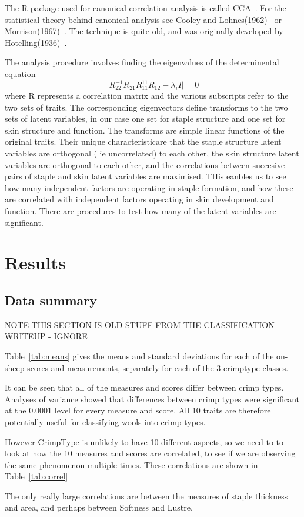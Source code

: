 \documentclass[titlepage]{article}  %
\begin{document}
The R package used for canonical correlation analysis is called CCA~\cite{rpack:1}. For the statistical theory behind canonical analysis see Cooley and Lohnes(1962)~\cite{cool:62} or Morrison(1967)~\cite{morr:67}. The technique is quite old, and was originally developed by Hotelling(1936)~\cite{hote:36}.

The analysis procedure involves finding the eigenvalues of the determinental equation
\begin{equation}
\mid R_{22}^{-1} R_{21} R_{11}^{11} R_{12} - \lambda_{i}I \mid = 0
\end{equation}
where R represents a correlation matrix and the various subscripts refer to the two sets of traits.
The corresponding eigenvectors define transforms to the two sets of latent variables, in our case one set for staple structure and one set for skin structure and function. The transforms are simple linear functions of the original traits. Their unique characteristicare that the staple structure latent variables are orthogonal ( ie uncorrelated) to each other, the skin structure latent variables are orthogonal to each other, and the correlations between succesive pairs of staple and skin latent variables are maximised. THis eanbles us to see how many independent factors are operating in staple formation, and how these are correlated with independent factors operating in skin development and function.
There are procedures to test how many of the latent variables are significant.



\section{Results}
\subsection{Data summary}
NOTE THIS SECTION IS OLD STUFF FROM THE CLASSIFICATION WRITEUP - IGNORE

Table~\ref{tab:means} gives the means and standard deviations for each of the on-sheep scores and measurements, separately for each of the 3 crimptype classes.

It can be seen that all of the measures and scores differ between crimp types. Analyses of variance showed that differences between crimp types were significant at the 0.0001 level for every measure and score. All 10 traits are therefore potentially useful for classifying wools into crimp types. 

However CrimpType is unlikely to have 10 different aspects, so we need to to look at how the 10 measures and scores are correlated, to see if we are observing the same phenomenon multiple times. These correlations are shown in Table~\ref{tab:correl}

The only really large correlations are between the measures of staple thickness and area, and perhaps between Softness and Lustre.
\end{document}
